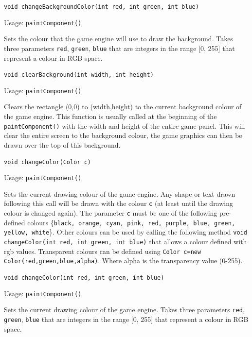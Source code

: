 \documentclass[a4paper, 10pt]{report}
\begin{document}
\hrulefill

{\large {\tt void changeBackgroundColor(int red, int green, int blue)}}

Usage: {\tt paintComponent()}

Sets the colour that the game engine will use to draw the background. Takes three parameters {\tt red}, {\tt green}, {\tt blue} that are integers in the range [0, 255] that represent a colour in RGB space.

\hrulefill

{\large {\tt void clearBackground(int width, int height)}}

Usage: {\tt paintComponent()}

Clears the rectangle (0,0) to (width,height) to the current background colour of the game engine. This function is usually called at the beginning of the {\tt paintComponent()} with the width and height of the entire game panel. This will clear the entire screen to the background colour, the game graphics can then be drawn over the top of this background.

\hrulefill

{\large {\tt void changeColor(Color c)}}

Usage: {\tt paintComponent()}

Sets the current drawing colour of the game engine. Any shape or text drawn following this call will be drawn with the colour {\tt c} (at least until the drawing colour is changed again). The parameter {\tt c} must be one of the following pre-defined colours \{{\tt black, orange, cyan, pink, red, purple, blue, green, yellow, white}\}. Other colours can be used by calling the following method {\tt void changeColor(int red, int green, int blue)} that allows a colour defined with rgb values. Transparent colours can be defined using {\tt Color c=new Color(red,green,blue,alpha)}. Where alpha is the transparency value (0-255).

\hrulefill

{\large {\tt void changeColor(int red, int green, int blue)}}

Usage: {\tt paintComponent()}

Sets the current drawing colour of the game engine. Takes three parameters {\tt red}, {\tt green}, {\tt blue} that are integers in the range [0, 255] that represent a colour in RGB space.

\hrulefill
\end{document}
